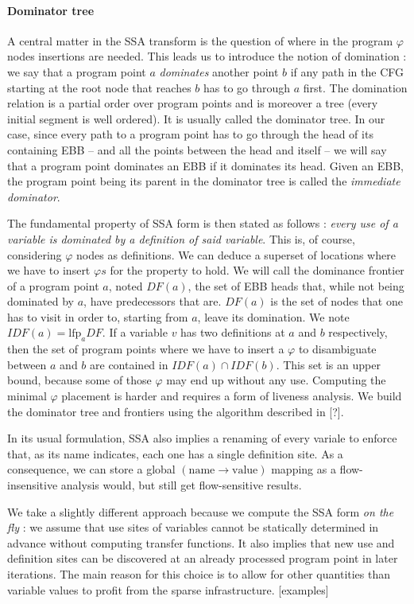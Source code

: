 \documentclass[11pt]{article}
\renewcommand{\phi}{\varphi}
\begin{document}
\paragraph{Dominator tree} A central matter in the SSA transform is the question of where in the program $\phi$ nodes insertions are needed.
This leads us to introduce the notion of domination : we say that a program point $a$ \emph{dominates} another point $b$ if any path in the CFG starting at the root node that reaches $b$ has to go through $a$ first. The domination relation is a partial order over program points and is moreover a tree (every initial segment is well ordered). It is usually called the dominator tree. In our case, since every path to a program point has to go through the head of its containing EBB -- and all the points between the head and itself -- we will say that a program point dominates an EBB if it dominates its head. Given an EBB, the program point being its parent in the dominator tree is called the \emph{immediate dominator}.

The fundamental property of SSA form is then stated as follows : \emph{every use of a variable is dominated by a definition of said variable}. This is, of course, considering $\phi$ nodes as definitions. We can deduce a superset of locations where we have to insert $\phi s$ for the property to hold. We will call the dominance frontier of a program point $a$, noted $DF(a)$, the set of EBB heads that, while not being dominated by $a$, have predecessors that are. $DF(a)$ is the set of nodes that one has to visit in order to, starting from $a$, leave its domination. We note $IDF(a) = \text{lfp}_aDF$. If a variable $v$ has two definitions at $a$ and $b$ respectively, then the set of program points where we have to insert a $\phi$ to disambiguate between $a$ and $b$ are contained in $IDF(a)\cap IDF(b)$. This set is an upper bound, because some of those $\phi$ may end up without any use. Computing the minimal $\phi$ placement is harder and requires a form of liveness analysis. We build the dominator tree and frontiers using the algorithm described in [?].

In its usual formulation, SSA also implies a renaming of every variale to enforce that, as its name indicates, each one has a single definition site. As a consequence, we can store a global $(\text{name}\to\text{value})$ mapping as a flow-insensitive analysis would, but still get flow-sensitive results.

We take a slightly different approach because we compute the SSA form \emph{on the fly} : we assume that use sites of variables cannot be statically determined in advance without computing transfer functions. It also implies that new use and definition sites can be discovered at an already processed program point in later iterations.
The main reason for this choice is to allow for other quantities than variable values to profit from the sparse infrastructure.
[examples]
\end{document}
